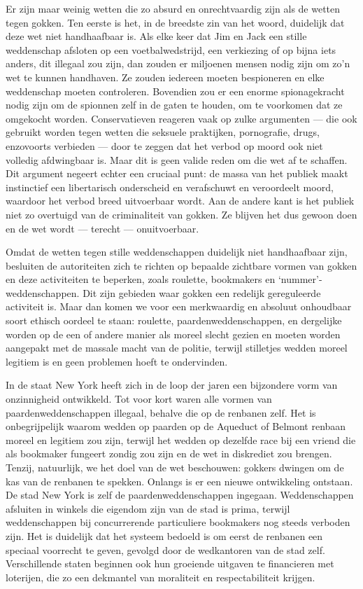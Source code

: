 \documentclass[
  a5paper,
  smalldemyvopaper,10pt,twoside,onecolumn,openright,extrafontsizes,hidelinks]{memoir}
\begin{document}
Er zijn maar weinig wetten die zo absurd en onrechtvaardig zijn als de
wetten tegen gokken. Ten eerste is het, in de breedste zin van het
woord, duidelijk dat deze wet niet handhaafbaar is. Als elke keer dat
Jim en Jack een stille weddenschap afsloten op een voetbalwedstrijd, een
verkiezing of op bijna iets anders, dit illegaal zou zijn, dan zouden er
miljoenen mensen nodig zijn om zo'n wet te kunnen handhaven. Ze zouden
iedereen moeten bespioneren en elke weddenschap moeten controleren.
Bovendien zou er een enorme spionagekracht nodig zijn om de spionnen
zelf in de gaten te houden, om te voorkomen dat ze omgekocht worden.
Conservatieven reageren vaak op zulke argumenten --- die ook gebruikt
worden tegen wetten die seksuele praktijken, pornografie, drugs,
enzovoorts verbieden --- door te zeggen dat het verbod op moord ook niet
volledig afdwingbaar is. Maar dit is geen valide reden om die wet af te
schaffen. Dit argument negeert echter een cruciaal punt: de massa van
het publiek maakt instinctief een libertarisch onderscheid en
verafschuwt en veroordeelt moord, waardoor het verbod breed uitvoerbaar
wordt. Aan de andere kant is het publiek niet zo overtuigd van de
criminaliteit van gokken. Ze blijven het dus gewoon doen en de wet wordt
--- terecht --- onuitvoerbaar.

Omdat de wetten tegen stille weddenschappen duidelijk niet handhaafbaar
zijn, besluiten de autoriteiten zich te richten op bepaalde zichtbare
vormen van gokken en deze activiteiten te beperken, zoals roulette,
bookmakers en `nummer'-weddenschappen. Dit zijn gebieden waar gokken een
redelijk gereguleerde activiteit is. Maar dan komen we voor een
merkwaardig en absoluut onhoudbaar soort ethisch oordeel te staan:
roulette, paardenweddenschappen, en dergelijke worden op de een of
andere manier als moreel slecht gezien en moeten worden aangepakt met de
massale macht van de politie, terwijl stilletjes wedden moreel legitiem
is en geen problemen hoeft te ondervinden.

In de staat New York heeft zich in de loop der jaren een bijzondere vorm
van onzinnigheid ontwikkeld. Tot voor kort waren alle vormen van
paardenweddenschappen illegaal, behalve die op de renbanen zelf. Het is
onbegrijpelijk waarom wedden op paarden op de Aqueduct of Belmont
renbaan moreel en legitiem zou zijn, terwijl het wedden op dezelfde race
bij een vriend die als bookmaker fungeert zondig zou zijn en de wet in
diskrediet zou brengen. Tenzij, natuurlijk, we het doel van de wet
beschouwen: gokkers dwingen om de kas van de renbanen te spekken.
Onlangs is er een nieuwe ontwikkeling ontstaan. De stad New York is zelf
de paardenweddenschappen ingegaan. Weddenschappen afsluiten in winkels
die eigendom zijn van de stad is prima, terwijl weddenschappen bij
concurrerende particuliere bookmakers nog steeds verboden zijn. Het is
duidelijk dat het systeem bedoeld is om eerst de renbanen een speciaal
voorrecht te geven, gevolgd door de wedkantoren van de stad zelf.
Verschillende staten beginnen ook hun groeiende uitgaven te financieren
met loterijen, die zo een dekmantel van moraliteit en respectabiliteit
krijgen.
\end{document}
